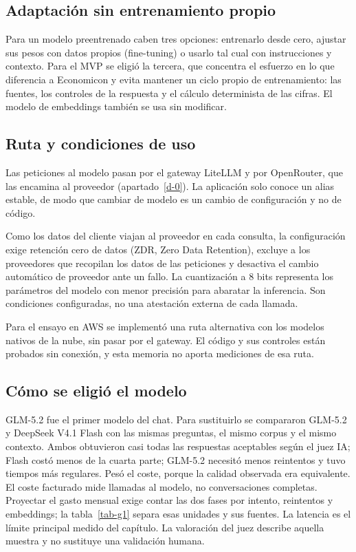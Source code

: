 \subsection{Adaptación sin entrenamiento propio}\label{g-1}

Para un modelo preentrenado caben tres opciones: entrenarlo desde cero, ajustar sus pesos con datos propios (fine-tuning) o usarlo tal cual con instrucciones y contexto. Para el MVP se eligió la tercera, que concentra el esfuerzo en lo que diferencia a Economicon y evita mantener un ciclo propio de entrenamiento: las fuentes, los controles de la respuesta y el cálculo determinista de las cifras. El modelo de embeddings también se usa sin modificar. \cite{config-gateway}

\subsection{Ruta y condiciones de uso}\label{g-2}

Las peticiones al modelo pasan por el gateway LiteLLM y por OpenRouter, que las encamina al proveedor (apartado~\ref{d-0}). La aplicación solo conoce un alias estable, de modo que cambiar de modelo es un cambio de configuración y no de código. \cite{config-gateway}

Como los datos del cliente viajan al proveedor en cada consulta, la configuración exige retención cero de datos (ZDR, Zero Data Retention), excluye a los proveedores que recopilan los datos de las peticiones y desactiva el cambio automático de proveedor ante un fallo. La cuantización a 8 bits representa los parámetros del modelo con menor precisión para abaratar la inferencia. Son condiciones configuradas, no una atestación externa de cada llamada.

Para el ensayo en AWS se implementó una ruta alternativa con los modelos nativos de la nube, sin pasar por el gateway. El código y sus controles están probados sin conexión, y esta memoria no aporta mediciones de esa ruta. \cite{aws}

\subsection{Cómo se eligió el modelo}\label{g-3}

GLM-5.2 fue el primer modelo del chat. Para sustituirlo se compararon GLM-5.2 y DeepSeek V4.1 Flash con las mismas preguntas, el mismo corpus y el mismo contexto. Ambos obtuvieron casi todas las respuestas aceptables según el juez IA; Flash costó menos de la cuarta parte; GLM-5.2 necesitó menos reintentos y tuvo tiempos más regulares. Pesó el coste, porque la calidad observada era equivalente. El coste facturado mide llamadas al modelo, no conversaciones completas. Proyectar el gasto mensual exige contar las dos fases por intento, reintentos y embeddings; la tabla~\ref{tab-g1} separa esas unidades y sus fuentes. La latencia es el límite principal medido del capítulo. \cite{coste-chat} La valoración del juez describe aquella muestra y no sustituye una validación humana. \cite{comparativa-modelos}

